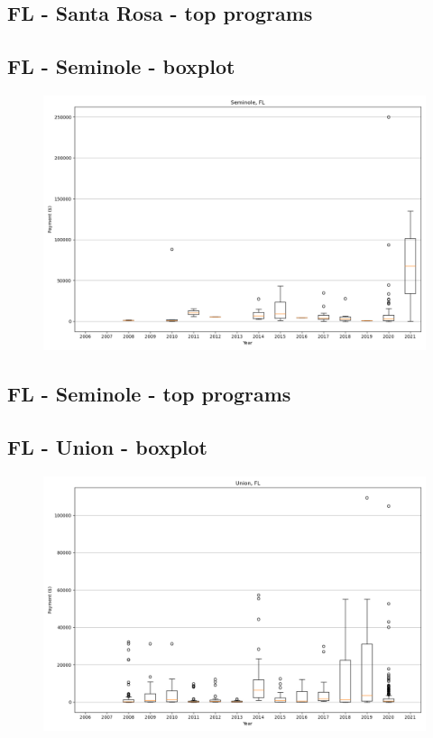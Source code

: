 \subsection*{FL - Santa Rosa - top programs}

\newpage
\subsection*{FL - Seminole - boxplot}
\begin{figure}[h]
\centering
\includegraphics[width=7in]{../output/boxplots/counties/Seminole-FL_boxplot.png}
\end{figure}


\subsection*{FL - Seminole - top programs}

\newpage
\subsection*{FL - Union - boxplot}
\begin{figure}[h]
\centering
\includegraphics[width=7in]{../output/boxplots/counties/Union-FL_boxplot.png}
\end{figure}


